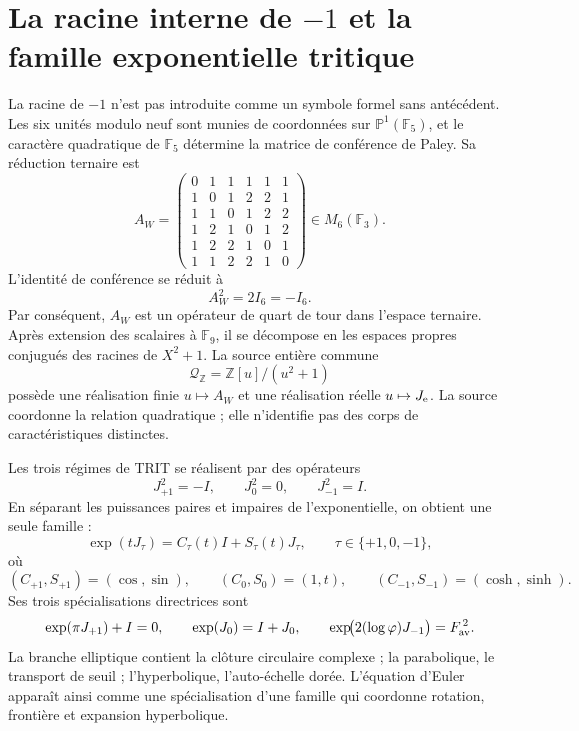 \label{chap:p3-83-26-raiz_menos_uno}

\section*{La racine interne de \texorpdfstring{\(-1\)}{-1} et la famille exponentielle tritique}

La racine de \(-1\) n’est pas introduite comme un symbole formel sans antécédent. Les
six unités modulo neuf sont munies de coordonnées sur
\(\mathbb P^1(\mathbb F_5)\), et le caractère quadratique de
\(\mathbb F_5\) détermine la matrice de conférence de Paley. Sa réduction
ternaire est
\[
 A_W=
 \begin{pmatrix}
 0&1&1&1&1&1\\
 1&0&1&2&2&1\\
 1&1&0&1&2&2\\
 1&2&1&0&1&2\\
 1&2&2&1&0&1\\
 1&1&2&2&1&0
 \end{pmatrix}\in M_6(\mathbb F_3).
\]
L’identité de conférence se réduit à
\begin{equation}\label{p3-83-c26-s1:eq:constantes-raiz-interna-menos-uno}
 \boxed{A_W^2=2I_6=-I_6.}
\end{equation}
Par conséquent, \(A_W\) est un opérateur de quart de tour dans l’espace ternaire.
Après extension des scalaires à \(\mathbb F_9\), il se décompose en les espaces
propres conjugués des racines de \(X^2+1\). La source entière commune
\[
 \mathcal Q_{\mathbb Z}=\mathbb Z[u]/(u^2+1)
\]
possède une réalisation finie \(u\mapsto A_W\) et une réalisation réelle
\(u\mapsto J_{\rm e}\). La source coordonne la relation quadratique ; elle n’identifie pas
des corps de caractéristiques distinctes.

Les trois régimes de TRIT se réalisent par des opérateurs
\[
 J_{+1}^2=-I,\qquad J_0^2=0,\qquad J_{-1}^2=I.
\]
En séparant les puissances paires et impaires de l’exponentielle, on obtient une
seule famille :
\begin{equation}\label{p3-83-c26-s1:eq:constantes-euler-extendido}
 \boxed{
 \exp(tJ_\tau)=C_\tau(t)I+S_\tau(t)J_\tau,
 \qquad \tau\in\{+1,0,-1\},}
\end{equation}
où
\[
 (C_{+1},S_{+1})=(\cos,\sin),\qquad
 (C_0,S_0)=(1,t),\qquad
 (C_{-1},S_{-1})=(\cosh,\sinh).
\]
Ses trois spécialisations directrices sont
\begin{equation}\label{p3-83-c26-s1:eq:constantes-euler-tres-ramas}
 \exp(\pi J_{+1})+I=0,\qquad
 \exp(J_0)=I+J_0,\qquad
 \exp\!\bigl(2(\log\varphi)J_{-1}\bigr)=F_{\rm av}^{\,2}.
\end{equation}
La branche elliptique contient la clôture circulaire complexe ; la parabolique, le
transport de seuil ; l’hyperbolique, l’auto-échelle dorée. L’équation
d’Euler apparaît ainsi comme une spécialisation d’une famille qui coordonne rotation,
frontière et expansion hyperbolique.


